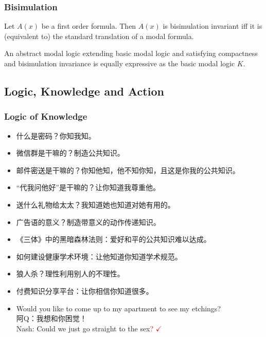 \documentclass[UTF8,aspectratio=43,11pt,colorlinks,compress,openany]{beamer}%
\begin{document}
\begin{frame}\frametitle{Bisimulation}
	\begin{theorem}
		Let $A(x)$ be a first order formula. Then $A(x)$ is bisimulation invariant iff it is (equivalent to) the standard translation of a modal formula.
	\end{theorem}
	\begin{theorem}
		An abstract modal logic extending basic modal logic and satisfying compactness and bisimulation invariance is equally expressive as the basic modal logic $K$.
	\end{theorem}
\end{frame}

\subsection{Logic, Knowledge and Action}

\begin{frame}\frametitle{Logic of Knowledge}
\begin{itemize}
	\item 什么是密码？你知我知。
	\item 微信群是干嘛的？制造公共知识。
	\item 邮件密送是干嘛的？你知他知，他不知你知，且这是你我的公共知识。
	\item “代我问他好”是干嘛的？让你知道我尊重他。
	\item 送什么礼物给太太？我知道她也知道对她有用的。
	\item 广告语的意义？制造带意义的动作传递知识。
	\item 《三体》中的黑暗森林法则：爱好和平的公共知识难以达成。
	\item 如何建设健康学术环境：让他知道你知道学术规范。
	\item 狼人杀？理性利用别人的不理性。
	\item 付费知识分享平台：让你相信你知道很多。
	\item Would you like to come up to my apartment to see my etchings?\\
	阿Q：我想和你困觉！\\
	Nash: Could we just go straight to the sex\textcolor{red}{? $\checkmark$\!\!\!\!}
\end{itemize}
\end{frame}
\end{document}
